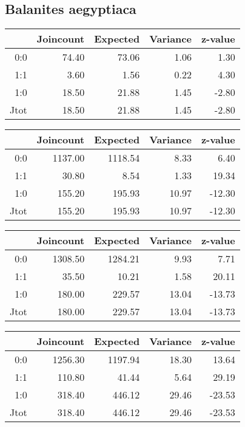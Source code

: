 \documentclass[a4paper, oneside, 12pt]{book}
\begin{document}
\subsection{Balanites aegyptiaca}
\begin{table}[ht]
	\centering
	\begin{tabular}{rrrrr}
		\hline
		& Joincount & Expected & Variance & z-value \\ 
		\hline
		0:0 & 74.40 & 73.06 & 1.06 & 1.30 \\ 
		1:1 & 3.60 & 1.56 & 0.22 & 4.30 \\ 
		1:0 & 18.50 & 21.88 & 1.45 & -2.80 \\ 
		Jtot & 18.50 & 21.88 & 1.45 & -2.80 \\ 
		\hline
	\end{tabular}
\end{table}

\begin{table}[ht]
	\centering
	\begin{tabular}{rrrrr}
		\hline
		& Joincount & Expected & Variance & z-value \\ 
		\hline
		0:0 & 1137.00 & 1118.54 & 8.33 & 6.40 \\ 
		1:1 & 30.80 & 8.54 & 1.33 & 19.34 \\ 
		1:0 & 155.20 & 195.93 & 10.97 & -12.30 \\ 
		Jtot & 155.20 & 195.93 & 10.97 & -12.30 \\ 
		\hline
	\end{tabular}
\end{table}

\begin{table}[ht]
	\centering
	\begin{tabular}{rrrrr}
		\hline
		& Joincount & Expected & Variance & z-value \\ 
		\hline
		0:0 & 1308.50 & 1284.21 & 9.93 & 7.71 \\ 
		1:1 & 35.50 & 10.21 & 1.58 & 20.11 \\ 
		1:0 & 180.00 & 229.57 & 13.04 & -13.73 \\ 
		Jtot & 180.00 & 229.57 & 13.04 & -13.73 \\ 
		\hline
	\end{tabular}
\end{table}

\begin{table}[H]
	\centering
	\begin{tabular}{rrrrr}
		\hline
		& Joincount & Expected & Variance & z-value \\ 
		\hline
		0:0 & 1256.30 & 1197.94 & 18.30 & 13.64 \\ 
		1:1 & 110.80 & 41.44 & 5.64 & 29.19 \\ 
		1:0 & 318.40 & 446.12 & 29.46 & -23.53 \\ 
		Jtot & 318.40 & 446.12 & 29.46 & -23.53 \\ 
		\hline
	\end{tabular}
\end{table}
\end{document}
